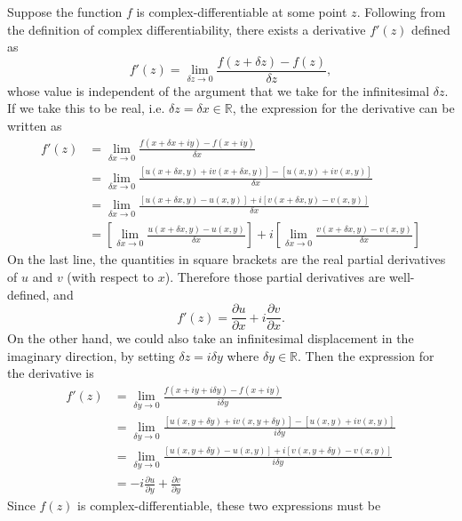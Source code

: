 \documentclass[10pt,a4paper]{article}
\begin{document}
Suppose the function $f$ is complex-differentiable at some point
$z$. Following from the definition of complex differentiability, there
exists a derivative $f'(z)$ defined as
\begin{equation}
f'(z) = \lim_{\delta z \rightarrow 0} \frac{f(z+\delta z) - f(z)}{\delta z},
\end{equation}
whose value is independent of the argument that we take for the
infinitesimal $\delta z$. If we take this to be real, i.e.
$\delta z = \delta x \in \mathbb{R}$, the expression for the
derivative can be written as
\begin{align}f'(z) &= \lim_{\delta x \rightarrow 0} \frac{f(x+\delta x + i y) - f(x + i y)}{\delta x} \\ &= \lim_{\delta x \rightarrow 0} \frac{\left[u(x+\delta x, y) + iv(x+\delta x, y)\right] - \left[u(x, y) + i v(x,y)\right]}{\delta x}\\ &= \lim_{\delta x \rightarrow 0} \frac{\left[u(x+\delta x, y) - u(x,y)\right] + i \left[v(x+\delta x, y)-v(x,y)\right]}{\delta x} \\ &= \left[ \lim_{\delta x \rightarrow 0} \frac{u(x+\delta x, y) - u(x,y)}{\delta x}\right] + i \left[ \lim_{\delta x \rightarrow 0} \frac{v(x+\delta x, y) - v(x,y)}{\delta x}\right]
\end{align}
On the last line, the quantities in square brackets are the real partial
derivatives of $u$ and $v$ (with respect to $x$). Therefore those
partial derivatives are well-defined, and
\begin{equation}
f'(z) = \frac{\partial u}{\partial x} + i \frac{\partial v}{\partial x}.
\end{equation}
On the other hand, we could also take an infinitesimal displacement in
the imaginary direction, by setting $\delta z = i \delta y$ where
$\delta y \in \mathbb{R}$. Then the expression for the derivative is
\begin{align}
  f'(z) &= \lim_{\delta y \rightarrow 0} \frac{f(x+ i y + i\delta y) - f(x + i y)}{i\delta y} \\ &= \lim_{\delta y \rightarrow 0} \frac{\left[u(x, y+\delta y) + iv(x, y+\delta y)\right] - \left[u(x, y) + i v(x,y)\right]}{i\delta y}\\ &= \lim_{\delta y \rightarrow 0} \frac{\left[u(x, y+\delta y) - u(x,y)\right] + i \left[v(x, y+\delta y)-v(x,y)\right]}{i\delta y} \\ & = -i\frac{\partial u}{\partial y} + \frac{\partial v}{\partial y}
\end{align}
Since $f(z)$ is complex-differentiable, these two expressions must be
\end{document}
